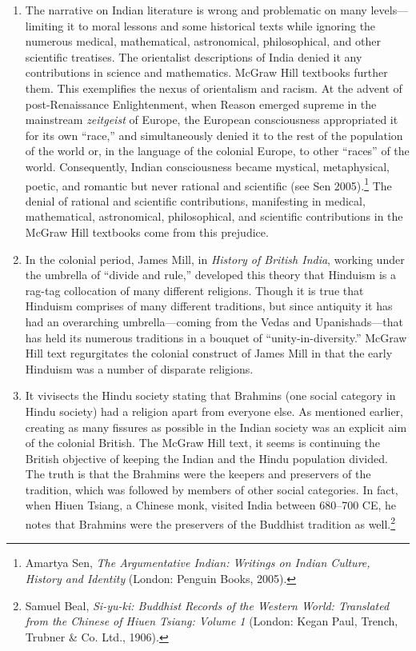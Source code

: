 \begin{enumerate}
\item The narrative on Indian literature is wrong and problematic on many levels—limiting it to moral lessons and some historical texts while ignoring the numerous medical, mathematical, astronomical, philosophical, and other scientific treatises. The orientalist descriptions of India denied it any contributions in science and mathematics. McGraw Hill textbooks further them. This exemplifies the nexus of orientalism and racism. At the advent of post-Renaissance Enlightenment, when Reason emerged supreme in the mainstream \textit{zeitgeist} of Europe, the European consciousness appropriated it for its own “race,” and simultaneously denied it to the rest of the population of the world or, in the language of the colonial Europe, to other “races” of the world. Consequently, Indian consciousness became mystical, metaphysical, poetic, and romantic but never rational and scientific (see Sen 2005).\footnote{Amartya Sen, \textit{The Argumentative Indian: Writings on Indian Culture, History and Identity} (London: Penguin Books, 2005).} The denial of rational and scientific contributions, manifesting in medical, mathematical, astronomical, philosophical, and scientific contributions in the McGraw Hill textbooks come from this prejudice. 

\item In the colonial period, James Mill, in \textit{History of British India}, working under the umbrella of “divide and rule,” developed this theory that Hinduism is a rag-tag collocation of many different religions. Though it is true that Hinduism comprises of many different traditions, but since antiquity it has had an overarching umbrella—coming from the Vedas and Upanishads—that has held its numerous traditions in a bouquet of “unity-in-diversity.” McGraw Hill text regurgitates the colonial construct of James Mill in that the early Hinduism was a number of disparate religions.

\item It vivisects the Hindu society stating that Brahmins (one social category in Hindu society) had a religion apart from everyone else. As mentioned earlier, creating as many fissures as possible in the Indian society was an explicit aim of the colonial British. The McGraw Hill text, it seems is continuing the British objective of keeping the Indian and the Hindu population divided. The truth is that the Brahmins were the keepers and preservers of the tradition, which was followed by members of other social categories. In fact, when Hiuen Tsiang, a Chinese monk, visited India between 680--700 CE, he notes that Brahmins were the preservers of the Buddhist tradition as well.\footnote{Samuel Beal, \textit{Si-yu-ki: Buddhist Records of the Western World: Translated from the Chinese of Hiuen Tsiang: Volume 1} (London: Kegan Paul, Trench, Trubner \& Co. Ltd., 1906).} 


\end{enumerate}
